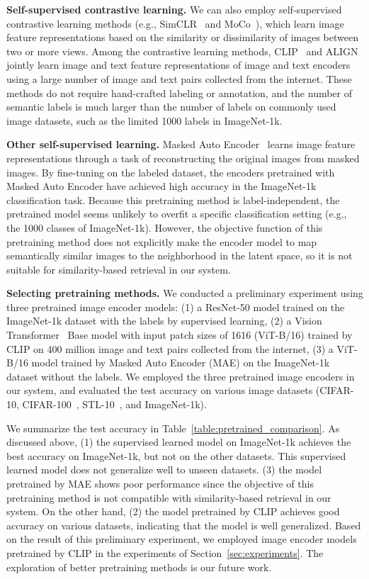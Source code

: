 \documentclass[runningheads]{llncs}
\begin{document}
\noindent
\textbf{Self-supervised contrastive learning.}
We can also employ self-supervised contrastive learning methods (e.g., SimCLR~\cite{SimCLR} and MoCo~\cite{MOCO,MOCOV2}), which learn image feature representations based on the similarity or dissimilarity of images between two or more views.
Among the contrastive learning methods, CLIP~\cite{CLIP} and ALIGN~\cite{ALIGN} 
jointly learn image and text feature representations of image and text encoders using a large number of image and text pairs collected from the internet.
These methods do not require hand-crafted labeling or annotation, and the number of semantic labels is much larger than the number of labels on commonly used image datasets, such as the limited 1000 labels in ImageNet-1k. 


\noindent
\textbf{Other self-supervised learning.}
Masked Auto Encoder~\cite{MAE} learns image feature representations through a task of reconstructing the original images from masked images. 
By fine-tuning on the labeled dataset, the encoders pretrained with Masked Auto Encoder have achieved high accuracy in the ImageNet-1k classification task.
Because this pretraining method is label-independent, the pretrained model seems unlikely to overfit a specific classification setting (e.g., the 1000 classes of ImageNet-1k).
However, the objective function of this pretraining method does not explicitly make the encoder model to map semantically similar images to the neighborhood in the latent space,
so it is not suitable for similarity-based retrieval in our system.


\noindent
\textbf{Selecting pretraining methods.}
We conducted a preliminary experiment using three pretrained image encoder models:
(1) a ResNet-50 model trained on the ImageNet-1k dataset with the labels by supervised learning,
(2) a Vision Transformer~\cite{ViT} Base model with input patch sizes of 1616 (ViT-B/16) trained by CLIP on 400 million image and text pairs collected from the internet,
(3) a ViT-B/16 model trained by Masked Auto Encoder (MAE) on the ImageNet-1k dataset without the labels.
We employed the three pretrained image encoders in our system, and evaluated the test accuracy on various image datasets (CIFAR-10, CIFAR-100~\cite{CIFAR10}, STL-10~\cite{STL10}, and ImageNet-1k).


We summarize the test accuracy in Table~\ref{table:pretrained_comparison}.
As discussed above, (1) the supervised learned model on ImageNet-1k achieves the best accuracy on ImageNet-1k, but not on the other datasets.
This supervised learned model does not generalize well to unseen datasets. 
(3) the model pretrained by MAE shows poor performance since the objective of this pretraining method is not compatible with similarity-based retrieval in our system.
On the other hand, (2) the model pretrained by CLIP achieves good accuracy on various datasets, indicating that the model is well generalized.
Based on the result of this preliminary experiment, we employed image encoder models pretrained by CLIP in the experiments of Section~\ref{sec:experiments}.
The exploration of better pretraining methods is our future work. 
\end{document}
